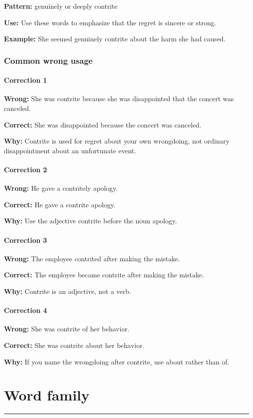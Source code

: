 \documentclass[11pt]{article}
\newcommand{\sectionrule}{\par\vspace{-0.5em}\noindent\textcolor{Accent}{\rule{\linewidth}{0.6pt}}\par}
\begin{document}
\textbf{Pattern:} genuinely or deeply contrite

\textbf{Use:} Use these words to emphasize that the regret is sincere or strong.

\textbf{Example:} She seemed genuinely contrite about the harm she had caused.

\subsubsection{Common wrong usage}
\paragraph{Correction 1}
\textbf{Wrong:} She was contrite because she was disappointed that the concert was canceled.

\textbf{Correct:} She was disappointed because the concert was canceled.

\textbf{Why:} Contrite is used for regret about your own wrongdoing, not ordinary disappointment about an unfortunate event.

\paragraph{Correction 2}
\textbf{Wrong:} He gave a contritely apology.

\textbf{Correct:} He gave a contrite apology.

\textbf{Why:} Use the adjective contrite before the noun apology.

\paragraph{Correction 3}
\textbf{Wrong:} The employee contrited after making the mistake.

\textbf{Correct:} The employee became contrite after making the mistake.

\textbf{Why:} Contrite is an adjective, not a verb.

\paragraph{Correction 4}
\textbf{Wrong:} She was contrite of her behavior.

\textbf{Correct:} She was contrite about her behavior.

\textbf{Why:} If you name the wrongdoing after contrite, use about rather than of.

\section{Word family}
\sectionrule
\end{document}
